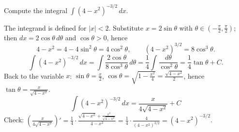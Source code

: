 
\begin{question}
Compute the integral $\displaystyle\int(4-x^2)^{-3/2}\,dx$. \quad [\underline{Hint}: you may substitute $x=2\sin\theta$.]
\end{question}

\begin{solution}
The integrand is defined for $|x|<2$. Substitute $x=2\sin\theta$ with $\theta\in\left(-\frac\pi2,\frac\pi2\right)$; then $dx=2\cos\theta\,d\theta$ and $\cos\theta>0$, hence
\[ 4-x^2=4-4\sin^2\theta=4\cos^2\theta,\qquad (4-x^2)^{3/2}=8\cos^3\theta. \]
\[ \int(4-x^2)^{-3/2}\,dx=\int\frac{2\cos\theta}{8\cos^3\theta}\,d\theta=\frac14\int\frac{d\theta}{\cos^2\theta}=\frac14\tan\theta+C. \]
Back to the variable $x$: $\sin\theta=\frac x2$, $\cos\theta=\sqrt{1-\frac{x^2}{4}}=\frac{\sqrt{4-x^2}}{2}$, hence $\tan\theta=\frac{x}{\sqrt{4-x^2}}$.
\[ \boxed{\int(4-x^2)^{-3/2}\,dx=\frac{x}{4\sqrt{4-x^2}}+C} \]
Check: $\left(\frac{x}{4\sqrt{4-x^2}}\right)'=\frac14\cdot\frac{\sqrt{4-x^2}+\frac{x^2}{\sqrt{4-x^2}}}{4-x^2}=\frac14\cdot\frac{4}{(4-x^2)^{3/2}}=(4-x^2)^{-3/2}$.
\end{solution}
